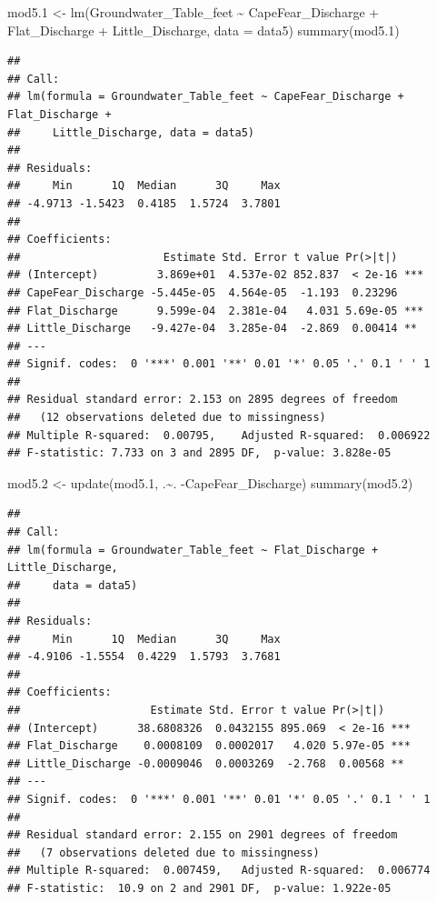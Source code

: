 \documentclass[
  12pt,
]{article}
\newenvironment{Shaded}{\begin{snugshade}}{\end{snugshade}}
\newcommand{\AttributeTok}[1]{\textcolor[rgb]{0.77,0.63,0.00}{#1}}
\newcommand{\FloatTok}[1]{\textcolor[rgb]{0.00,0.00,0.81}{#1}}
\newcommand{\FunctionTok}[1]{\textcolor[rgb]{0.00,0.00,0.00}{#1}}
\newcommand{\NormalTok}[1]{#1}
\newcommand{\OtherTok}[1]{\textcolor[rgb]{0.56,0.35,0.01}{#1}}
\newcommand{\SpecialCharTok}[1]{\textcolor[rgb]{0.00,0.00,0.00}{#1}}
\begin{document}
\begin{Shaded}
\begin{Highlighting}[]
\NormalTok{mod5}\FloatTok{.1} \OtherTok{\textless{}{-}} \FunctionTok{lm}\NormalTok{(Groundwater\_Table\_feet }\SpecialCharTok{\textasciitilde{}}\NormalTok{ CapeFear\_Discharge }\SpecialCharTok{+}\NormalTok{ Flat\_Discharge }\SpecialCharTok{+}\NormalTok{ Little\_Discharge, }\AttributeTok{data =}\NormalTok{ data5)}
\FunctionTok{summary}\NormalTok{(mod5}\FloatTok{.1}\NormalTok{)}
\end{Highlighting}
\end{Shaded}

\begin{verbatim}
## 
## Call:
## lm(formula = Groundwater_Table_feet ~ CapeFear_Discharge + Flat_Discharge + 
##     Little_Discharge, data = data5)
## 
## Residuals:
##     Min      1Q  Median      3Q     Max 
## -4.9713 -1.5423  0.4185  1.5724  3.7801 
## 
## Coefficients:
##                      Estimate Std. Error t value Pr(>|t|)    
## (Intercept)         3.869e+01  4.537e-02 852.837  < 2e-16 ***
## CapeFear_Discharge -5.445e-05  4.564e-05  -1.193  0.23296    
## Flat_Discharge      9.599e-04  2.381e-04   4.031 5.69e-05 ***
## Little_Discharge   -9.427e-04  3.285e-04  -2.869  0.00414 ** 
## ---
## Signif. codes:  0 '***' 0.001 '**' 0.01 '*' 0.05 '.' 0.1 ' ' 1
## 
## Residual standard error: 2.153 on 2895 degrees of freedom
##   (12 observations deleted due to missingness)
## Multiple R-squared:  0.00795,    Adjusted R-squared:  0.006922 
## F-statistic: 7.733 on 3 and 2895 DF,  p-value: 3.828e-05
\end{verbatim}

\begin{Shaded}
\begin{Highlighting}[]
\NormalTok{mod5}\FloatTok{.2} \OtherTok{\textless{}{-}} \FunctionTok{update}\NormalTok{(mod5}\FloatTok{.1}\NormalTok{, .}\SpecialCharTok{\textasciitilde{}}\NormalTok{. }\SpecialCharTok{{-}}\NormalTok{CapeFear\_Discharge)}
\FunctionTok{summary}\NormalTok{(mod5}\FloatTok{.2}\NormalTok{)}
\end{Highlighting}
\end{Shaded}

\begin{verbatim}
## 
## Call:
## lm(formula = Groundwater_Table_feet ~ Flat_Discharge + Little_Discharge, 
##     data = data5)
## 
## Residuals:
##     Min      1Q  Median      3Q     Max 
## -4.9106 -1.5554  0.4229  1.5793  3.7681 
## 
## Coefficients:
##                    Estimate Std. Error t value Pr(>|t|)    
## (Intercept)      38.6808326  0.0432155 895.069  < 2e-16 ***
## Flat_Discharge    0.0008109  0.0002017   4.020 5.97e-05 ***
## Little_Discharge -0.0009046  0.0003269  -2.768  0.00568 ** 
## ---
## Signif. codes:  0 '***' 0.001 '**' 0.01 '*' 0.05 '.' 0.1 ' ' 1
## 
## Residual standard error: 2.155 on 2901 degrees of freedom
##   (7 observations deleted due to missingness)
## Multiple R-squared:  0.007459,   Adjusted R-squared:  0.006774 
## F-statistic:  10.9 on 2 and 2901 DF,  p-value: 1.922e-05
\end{verbatim}
\end{document}
